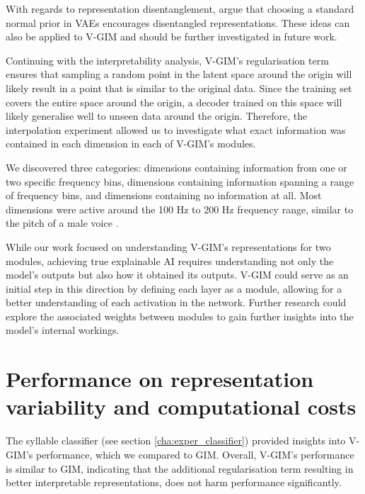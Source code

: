 	With regards to representation disentanglement, \cite{burgessUnderstandingDisentanglingBeta2018} argue that choosing a standard normal prior in VAEs encourages disentangled representations. These ideas can also be applied to V-GIM and should be further investigated in future work.
	
	

	Continuing with the interpretability analysis, V-GIM's regularisation term ensures that sampling a random point in the latent space around the origin will likely result in a point that is similar to the original data. Since the training set covers the entire space around the origin, a decoder trained on this space will likely generalise well to unseen data around the origin. Therefore, the interpolation experiment allowed us to investigate what exact information was contained in each dimension in each of V-GIM's modules. 
	
	We discovered three categories: dimensions containing information from one or two specific frequency bins, dimensions containing information spanning a range of frequency bins, and dimensions containing no information at all. Most dimensions were active around the 100 Hz to 200 Hz frequency range, similar to the pitch of a male voice \citep{rePreferencesVeryLow2012}.
	
	While our work focused on understanding V-GIM's representations for two modules, achieving true explainable AI requires understanding not only the model's outputs but also how it obtained its outputs. V-GIM could serve as an initial step in this direction by defining each layer as a module, allowing for a better understanding of each activation in the network. Further research could explore the associated weights between modules to gain further insights into the model's internal workings.

\section{Performance on representation variability and computational costs} 
		
		The syllable classifier (see section \ref{cha:exper_classifier}) provided insights into V-GIM's performance, which we compared to GIM. Overall, V-GIM's performance is similar to GIM, indicating that the additional regularisation term resulting in better interpretable representations, does not harm performance significantly.
		
